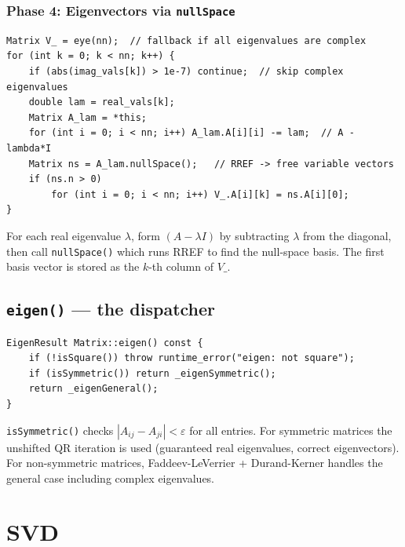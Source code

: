 \documentclass[12pt, a4paper]{article}
\newcommand{\fn}[1]{\texttt{\small\color{funcgreen}#1}}
\begin{document}
\subsubsection{Phase 4: Eigenvectors via \fn{nullSpace}}

\begin{lstlisting}
Matrix V_ = eye(nn);  // fallback if all eigenvalues are complex
for (int k = 0; k < nn; k++) {
    if (abs(imag_vals[k]) > 1e-7) continue;  // skip complex eigenvalues
    double lam = real_vals[k];
    Matrix A_lam = *this;
    for (int i = 0; i < nn; i++) A_lam.A[i][i] -= lam;  // A - lambda*I
    Matrix ns = A_lam.nullSpace();   // RREF -> free variable vectors
    if (ns.n > 0)
        for (int i = 0; i < nn; i++) V_.A[i][k] = ns.A[i][0];
}
\end{lstlisting}

For each real eigenvalue $\lambda$, form $(A - \lambda I)$ by subtracting
$\lambda$ from the diagonal, then call \fn{nullSpace()} which runs RREF to
find the null-space basis.  The first basis vector is stored as the $k$-th
column of $V\_$.

\subsection{\fn{eigen()} --- the dispatcher}

\begin{lstlisting}
EigenResult Matrix::eigen() const {
    if (!isSquare()) throw runtime_error("eigen: not square");
    if (isSymmetric()) return _eigenSymmetric();
    return _eigenGeneral();
}
\end{lstlisting}

\fn{isSymmetric()} checks $|A_{ij} - A_{ji}| < \varepsilon$ for all entries.
For symmetric matrices the unshifted QR iteration is used (guaranteed real
eigenvalues, correct eigenvectors).  For non-symmetric matrices, Faddeev-LeVerrier
+ Durand-Kerner handles the general case including complex eigenvalues.

\section{SVD}
\end{document}
